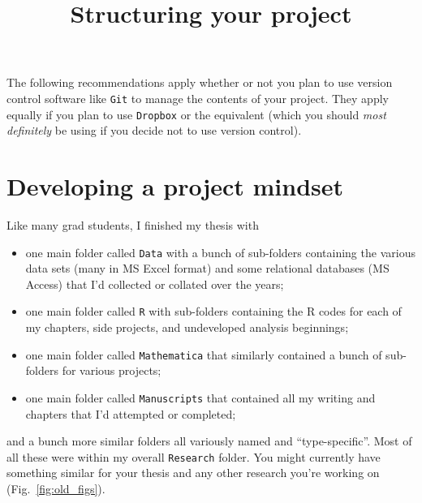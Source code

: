\documentclass[12pt,letterpaper]{article}
\author{}
\title{Structuring your project}
\date{}
\begin{document}
\maketitle

 \begin{tcolorbox}[breakable, enhanced, before upper={\parindent15pt}]
 	\noindent
 	The following recommendations apply whether or not you plan to 
 	use version control software like \texttt{Git} to manage the contents of your project.
 	They apply equally if you plan to use \texttt{Dropbox} or the equivalent (which you should 
	\textit{most definitely} be using if you decide not to use version control).
\end{tcolorbox}

\section{Developing a project mindset} \label{projectmindset}

Like many grad students, I finished my thesis with
\begin{itemize}
	\item one main folder called \texttt{Data} with a bunch of sub-folders containing the various data sets (many in MS Excel format) and some relational databases (MS Access) that I'd collected or collated over the years;
	\item one main folder called \texttt{R} with sub-folders containing the R codes for each of my chapters, side projects, and undeveloped analysis beginnings;
	\item one main folder called \texttt{Mathematica} that similarly contained a bunch of sub-folders for various projects;
	\item one main folder called \texttt{Manuscripts} that contained all my writing and chapters that I'd attempted or completed;
\end{itemize}
and a bunch more similar folders all variously named and ``type-specific''.
Most of all these were within my overall \texttt{Research} folder.
You might currently have something similar for your thesis and any other research you're working on 
(Fig.~\ref{fig:old_figs}).
\end{document}
